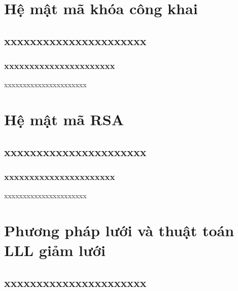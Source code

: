 \documentclass{beamer}
\begin{document}
\section{Hệ mật mã khóa công khai}
\subsection{xxxxxxxxxxxxxxxxxxxxxx}
\subsubsection{xxxxxxxxxxxxxxxxxxxxxx}
\begin{frame}{xxxxxxxxxxxxxxxxxxxxxx}

\end{frame}
\section{Hệ mật mã RSA}
\subsection{xxxxxxxxxxxxxxxxxxxxxx}
\subsubsection{xxxxxxxxxxxxxxxxxxxxxx}
\begin{frame}{xxxxxxxxxxxxxxxxxxxxxx}

\end{frame}
\section{Phương pháp lưới và thuật toán LLL giảm lưới}
\subsection{xxxxxxxxxxxxxxxxxxxxxx}
\end{document}
